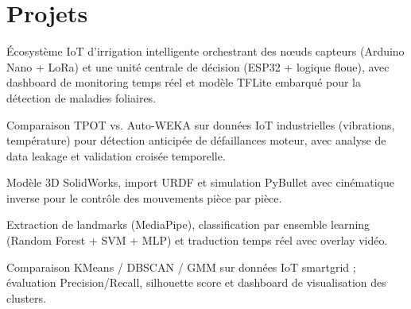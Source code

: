 \documentclass[]{plushcv}
\begin{document}
\begin{minipage}[t]{0.72\textwidth}
\section{Projets}

\vspace{\topsep}
\begin{tightemize}
\item Écosystème IoT d'irrigation intelligente orchestrant des nœuds capteurs (Arduino Nano + LoRa) et une unité centrale de décision (ESP32 + logique floue), avec dashboard de monitoring temps réel et modèle TFLite embarqué pour la détection de maladies foliaires.
\end{tightemize}
\sectionsep

\vspace{\topsep}
\begin{tightemize}
\item Comparaison TPOT vs. Auto-WEKA sur données IoT industrielles (vibrations, température) pour détection anticipée de défaillances moteur, avec analyse de data leakage et validation croisée temporelle.
\end{tightemize}
\sectionsep

\vspace{\topsep}
\begin{tightemize}
\item Modèle 3D SolidWorks, import URDF et simulation PyBullet avec cinématique inverse pour le contrôle des mouvements pièce par pièce.
\end{tightemize}
\sectionsep

\vspace{\topsep}
\begin{tightemize}
\item Extraction de landmarks (MediaPipe), classification par ensemble learning (Random Forest + SVM + MLP) et traduction temps réel avec overlay vidéo.
\end{tightemize}
\sectionsep

\vspace{\topsep}
\begin{tightemize}
\item Comparaison KMeans / DBSCAN / GMM sur données IoT smartgrid ; évaluation Precision/Recall, silhouette score et dashboard de visualisation des clusters.
\end{tightemize}
\sectionsep


\end{minipage}
\end{document}
